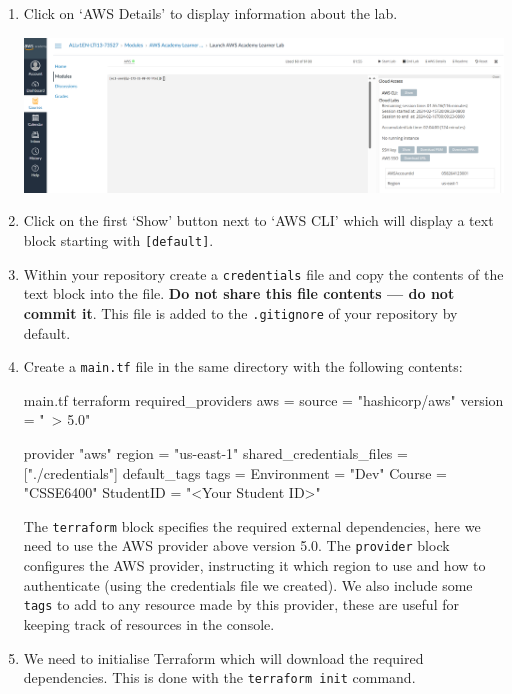 \documentclass{csse4400}
\begin{document}
\begin{enumerate}
\item Click on `AWS Details' to display information about the lab.

\hspace{-4mm}
\includegraphics[width=\textwidth]{images/aws-details}

\item Click on the first `Show' button next to `AWS CLI' which will display a text block starting with \texttt{[default]}.
\item Within your repository create a \texttt{credentials} file and copy the contents of the text block into the file.
\textbf{Do not share this file contents --- do not commit it}.
This file is added to the \texttt{.gitignore} of your repository by default.
\item Create a \texttt{main.tf} file in the same directory with the following contents:
\begin{code}[language=terraform,numbers=none]{main.tf}
terraform {
    required_providers {
        aws = {
            source  = "hashicorp/aws"
            version = "~> 5.0"
        }
    }
}

provider "aws" {
    region = "us-east-1"
    shared_credentials_files = ["./credentials"]
    default_tags {
        tags = {
            Environment = "Dev"
            Course      = "CSSE6400"
            StudentID   = "<Your Student ID>"
        }
  }
}
\end{code}

The \texttt{terraform} block specifies the required external dependencies, here we need to use the AWS provider above version 5.0.
The \texttt{provider} block configures the AWS provider, instructing it which region to use and how to authenticate (using the credentials file we created).
We also include some \texttt{tags} to add to any resource made by this provider, these are useful for keeping track of resources in the console.

\item We need to initialise Terraform which will download the required dependencies.
    This is done with the \texttt{terraform init} command.


\end{enumerate}
\end{document}
